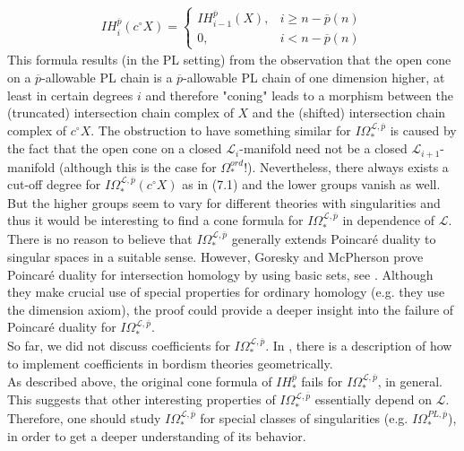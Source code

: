 \documentclass{scrreprt}
\begin{document}
\begin{align}
IH_i^{\overline{p}}(c^{\circ}X)=
\begin{cases} 
IH_{i-1}^{\overline{p}}(X), &i \geq n- \overline{p}(n) \\
0, &i < n- \overline{p}(n)
\end{cases}
\end{align}
This formula results (in the PL setting) from the observation that the open cone on a $\overline{p}$-allowable PL chain is a $\overline{p}$-allowable PL chain of one dimension higher, at least in certain degrees $i$ and therefore "coning" leads to a morphism between the (truncated) intersection chain complex of $X$ and the (shifted) intersection chain complex of $c^{\circ}X$. The obstruction to have something similar for $I\Omega_*^{\mathcal{L},\overline{p}}$ is caused by the fact that the open cone on a closed $\mathcal{L}_i$-manifold need not be a closed $\mathcal{L}_{i+1}$-manifold (although this is the case for $\Omega_*^{ord}$!). Nevertheless, there always exists a cut-off degree for $I\Omega_*^{\mathcal{L},\overline{p}}(c^{\circ}X)$ as in (7.1) and the lower groups vanish as well. But the higher groups seem to vary for different theories with singularities and thus it would be interesting to find a cone formula for $I\Omega_*^{\mathcal{L},\overline{p}}$ in dependence of $\mathcal{L}$. \\
There is no reason to believe that $I\Omega_*^{\mathcal{L},\overline{p}}$ generally extends Poincar\'{e} duality to singular spaces in a suitable sense. However, Goresky and McPherson prove Poincar\'e duality for intersection homology by using basic sets, see \cite{GM}. Although they make crucial use of special properties for ordinary homology (e.g. they use the dimension axiom), the proof could provide a deeper insight into the failure of Poincar\'e duality for $I\Omega_*^{\mathcal{L},\overline{p}}$. \\
So far, we did not discuss coefficients for $I\Omega_*^{\mathcal{L},\overline{p}}$. In \cite{BRS}, there is a description of how to implement coefficients in bordism theories geometrically.\\
As described above, the original cone formula of $IH_*^{\overline{p}}$ fails for $I\Omega_*^{\mathcal{L},\overline{p}}$, in general. This suggests that other interesting properties of $I\Omega_*^{\mathcal{L},\overline{p}}$ essentially depend on $\mathcal{L}$. Therefore, one should study $I\Omega_*^{\mathcal{L},\overline{p}}$ for special classes of singularities (e.g. $I\Omega_*^{PL,\overline{p}}$), in order to get a deeper understanding of its behavior.
\end{document}
